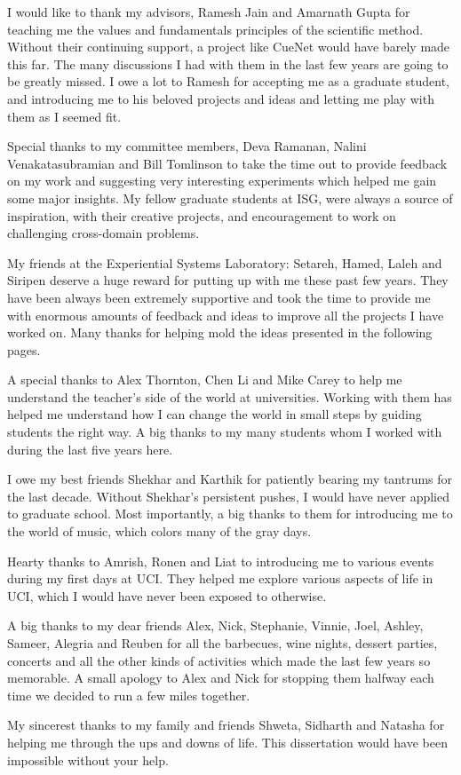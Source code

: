 \acknowledgments
{

I would like to thank my advisors, Ramesh Jain and Amarnath Gupta for teaching me the values and fundamentals principles of the scientific method. Without their continuing support, a project like CueNet would have barely made this far. The many discussions I had with them in the last few years are going to be greatly missed. I owe a lot to Ramesh for accepting me as a graduate student, and introducing me to his beloved projects and ideas and letting me play with them as I seemed fit. 

Special thanks to my committee members, Deva Ramanan, Nalini Venakatasubramian and Bill Tomlinson to take the time out to provide feedback on my work and suggesting very interesting experiments which helped me gain some major insights. My fellow graduate students at ISG, were always a source of inspiration, with their creative projects, and encouragement to work on challenging cross-domain problems.

My friends at the Experiential Systems Laboratory: Setareh, Hamed, Laleh and Siripen deserve a huge reward for putting up with me these past few years. They have been always been extremely supportive and took the time to provide me with enormous amounts of feedback and ideas to improve all the projects I have worked on. Many thanks for helping mold the ideas presented in the following pages.

A special thanks to Alex Thornton, Chen Li and Mike Carey to help me understand the teacher's side of the world at universities. Working with them has helped me understand how I can change the world in small steps by guiding students the right way. A big thanks to my many students whom I worked with during the last five years here.

I owe my best friends Shekhar and Karthik for patiently bearing my tantrums for the last decade. Without Shekhar's persistent pushes, I would have never applied to graduate school. Most importantly, a big thanks to them for introducing me to the world of music, which colors many of the gray days.

Hearty thanks to Amrish, Ronen and Liat to introducing me to various events during my first days at UCI. They helped me explore various aspects of life in UCI, which I would have never been exposed to otherwise. 

A big thanks to my dear friends Alex, Nick, Stephanie, Vinnie, Joel, Ashley, Sameer, Alegria and Reuben for all the barbecues, wine nights, dessert parties, concerts and all the other kinds of activities which made the last few years so memorable. A small apology to Alex and Nick for stopping them halfway each time we decided to run a few miles together. 

My sincerest thanks to my family and friends Shweta, Sidharth and Natasha for helping me through the ups and downs of life. This dissertation would have been impossible without your help.

}


